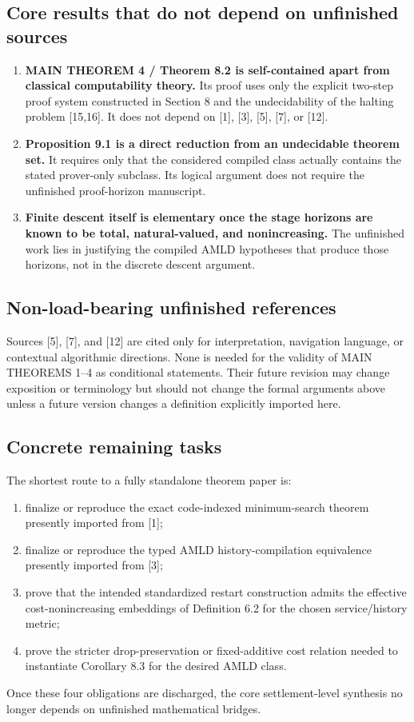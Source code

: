 \documentclass[11pt]{article}
\theoremstyle{definition}
\begin{document}
\subsection{Core results that do not depend on unfinished sources}
\begin{enumerate}[label=\textbf{S\arabic*.}]
\item \textbf{MAIN THEOREM 4 / Theorem 8.2 is self-contained apart from classical computability theory.} Its proof uses only the explicit two-step proof system constructed in Section 8 and the undecidability of the halting problem [15,16]. It does not depend on [1], [3], [5], [7], or [12].

\item \textbf{Proposition 9.1 is a direct reduction from an undecidable theorem set.} It requires only that the considered compiled class actually contains the stated prover-only subclass. Its logical argument does not require the unfinished proof-horizon manuscript.

\item \textbf{Finite descent itself is elementary once the stage horizons are known to be total, natural-valued, and nonincreasing.} The unfinished work lies in justifying the compiled AMLD hypotheses that produce those horizons, not in the discrete descent argument.
\end{enumerate}

\subsection{Non-load-bearing unfinished references}
Sources [5], [7], and [12] are cited only for interpretation, navigation language, or contextual algorithmic directions. None is needed for the validity of MAIN THEOREMS 1--4 as conditional statements. Their future revision may change exposition or terminology but should not change the formal arguments above unless a future version changes a definition explicitly imported here.

\subsection{Concrete remaining tasks}
The shortest route to a fully standalone theorem paper is:
\begin{enumerate}[label=(\arabic*)]
\item finalize or reproduce the exact code-indexed minimum-search theorem presently imported from [1];
\item finalize or reproduce the typed AMLD history-compilation equivalence presently imported from [3];
\item prove that the intended standardized restart construction admits the effective cost-nonincreasing embeddings of Definition 6.2 for the chosen service/history metric;
\item prove the stricter drop-preservation or fixed-additive cost relation needed to instantiate Corollary 8.3 for the desired AMLD class.
\end{enumerate}
Once these four obligations are discharged, the core settlement-level synthesis no longer depends on unfinished mathematical bridges.
\end{document}
